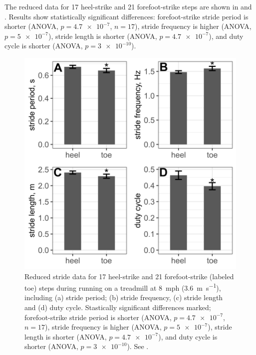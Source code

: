 The reduced data for 17 heel-strike and 21 forefoot-strike steps are shown in  and . Results show statistically significant differences: forefoot-strike stride period is shorter (ANOVA, $p=\num{4.7e-7}$, $n=17$), stride frequency is higher (ANOVA, $p=\num{5e-7}$), stride length is shorter (ANOVA, $p=\num{4.7e-7}$), and duty cycle is shorter (ANOVA, $p=\num{3e-10}$).
\begin{figure}
\begin{center}
\includegraphics{figures/stride-data.png}
\end{center}
\caption{Reduced stride data for 17 heel-strike and 21 forefoot-strike (labeled toe) steps during running on a treadmill at \SI{8}{mph} (\SI{3.6}{\meter\per\second}), including (a) stride period; (b) stride frequency, (c) stride length and (d) duty cycle. Stastically significant differences marked; forefoot-strike stride period is shorter (ANOVA, $p=\num{4.7e-7}$, $n=17$), stride frequency is higher (ANOVA, $p=\num{5e-7}$), stride length is shorter (ANOVA, $p=\num{4.7e-7}$), and duty cycle is shorter (ANOVA, $p=\num{3e-10}$). See .} 
\label{fig:results:stride}
\end{figure}

